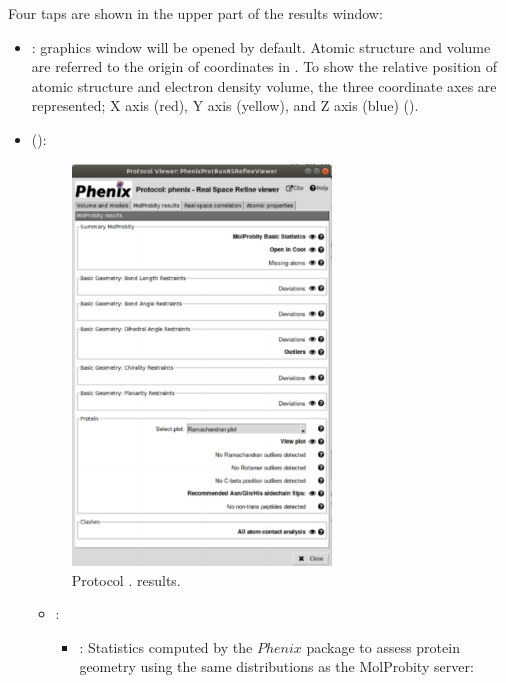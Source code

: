 \begin{itemize}
Four taps are shown in the upper part of the results window:
   \begin{itemize}
     \item {}: \chimera graphics window will be opened by default. Atomic structure and volume are referred to the origin of coordinates in \chimera. To show the relative position of atomic structure and electron density volume, the three coordinate axes are represented; X axis (red), Y axis (yellow), and Z axis (blue) ().
     \item {} ():
        \begin{figure}[H]
         \centering 
         \captionsetup{width=.7\linewidth} 
         \includegraphics[width=0.65\textwidth]{Images_appendix/Fig150.pdf}
         \caption{Protocol . \phenix {} results.}
         \label{fig:app_protocol_real_space_refine_3}
        \end{figure}
        
        \begin{itemize}
         \item {}: 
          \begin{itemize}
           \item {}: Statistics computed by the $Phenix$ package to assess protein geometry using the same distributions as the MolProbity server:\setlength{\parindent}{12pt}
           

\end{itemize}
\end{itemize}
\end{itemize}
\end{itemize}
